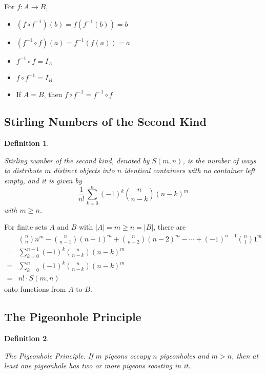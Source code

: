 \documentclass[12pt]{article}
\newtheorem{definition}{Definition} [section]
\begin{document}
For $f: A \rightarrow B$,
\begin{itemize}
\item $(f \circ f^{-1}) (b) = f(f^{-1}(b)) = b$
\item $(f^{-1} \circ f) (a) = f^{-1}(f(a)) = a$
\item $f^{-1} \circ f = I_A$
\item $f \circ f^{-1} = I_B$
\item If $A=B$, then $f \circ f^{-1} = f^{-1} \circ f$
\end{itemize}
\subsection{Stirling Numbers of the Second Kind}
\begin{definition}
\begin{em}
\emph{Stirling number of the second kind}, denoted by $S(m, n)$, is the number of ways to distribute $m$ distinct objects into $n$ identical containers with no container left empty, and it is given by
\[\frac{1}{n!} \sum_{k=0}^n (-1)^k \binom{n}{n-k} (n-k)^m\]
with $m \geq n$.
\end{em}
\end{definition}
For finite sets $A$ and $B$ with $|A|=m \geq n=|B|$, there are
\begin{eqnarray*}
& \displaystyle \binom{n}{n} n^m - \binom{n}{n-1} (n-1)^m + \binom{n}{n-2} (n-2)^m - \cdots + (-1)^{n-1} \binom{n}{1} 1^m\\
= & \displaystyle \sum^{n-1}_{k=0} (-1)^k \binom{n}{n-k} (n-k)^m\\
= & \displaystyle \sum^{n}_{k=0} (-1)^k \binom{n}{n-k} (n-k)^m\\
= & n! \cdot S(m, n)
\end{eqnarray*}
onto functions from $A$ to $B$.
\subsection{The Pigeonhole Principle}
\begin{definition}
\begin{em}
\emph{The Pigeonhole Principle.} If $m$ pigeons occupy $n$ pigeonholes and $m > n$, then at least one pigeonhole has two or more pigeons roosting in it.
\end{em}
\end{definition}
\end{document}
